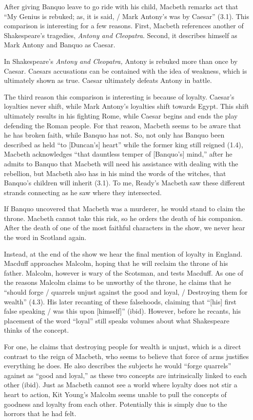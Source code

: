 \documentclass[12pt]{article}[titlepage]
\newcommand{\say}[1]{``#1''}
\newcommand{\1}{\={a}}
\newcommand{\2}{\={e}}
\newcommand{\3}{\={\i}}
\newcommand{\4}{\=o}
\newcommand{\5}{\=u}
\newcommand{\6}{\={A}}
\renewcommand{\,}{\textsuperscript{,}}
\begin{document}
After giving Banquo leave to go ride with his child, Macbeth remarks act that \say{My Genius is rebuked; as, it is said, / Mark Antony's was by Caesar} (3.1).
This comparison is interesting for a few reasons.
First, Macbeth references another of Shakespeare's tragedies, \textit{Antony and Cleopatra}.
Second, it describes himself as Mark Antony and Banquo as Caesar.

In Shakespeare's \textit{Antony and Cleopatra,} Antony is rebuked more than once by Caesar.
Caesars accusations can be contained with the idea of weakness, which is ultimately shown as true.
Caesar ultimately defeats Antony in battle.

The third reason this comparison is interesting is because of loyalty.
Caesar's loyalties never shift, while Mark Antony's loyalties shift towards Egypt.
This shift ultimately results in his fighting Rome, while Caesar begins and ends the play defending the Roman people.
For that reason, Macbeth seems to be aware that he has broken faith, while Banquo has not.
So, not only has Banquo been described as held \say{to [Duncan's] heart} while the former king still reigned (1.4), Macbeth acknowledges \say{that dauntless temper of [Banquo's] mind,} after he admits to Banquo that Macbeth will need his assistance with dealing with the rebellion, but Macbeth also has in his mind the words of the witches, that Banquo's children will inherit (3.1).
To me, Ready's Macbeth saw these different strands connecting as he saw where they intersected.

If Banquo uncovered that Macbeth was a murderer, he would stand to claim the throne.
Macbeth cannot take this risk, so he orders the death of his companion.
After the death of one of the most faithful characters in the show, we never hear the word in Scotland again.

Instead, at the end of the show we hear the final mention of loyalty in England.
Macduff approaches Malcolm, hoping that he will reclaim the throne of his father.
Malcolm, however is wary of the Scotsman, and tests Macduff.
As one of the reasons Malcolm claims to be unworthy of the throne, he claims that he \say{should forge / quarrels unjust against the good and loyal, / Destroying them for wealth} (4.3).
His later recanting of these falsehoods, claiming that \say{[his] first false speaking / was this upon [himself]} (ibid).
However, before he recants, his placement of the word \say{loyal} still speaks volumes about what Shakespeare thinks of the concept.

For one, he claims that destroying people for wealth is unjust, which is a direct contrast to the reign of Macbeth, who seems to believe that force of arms justifies everything he does.
He also describes the subjects he would \say{forge quarrels} against as \say{good and loyal,} as these two concepts are intrinsically linked to each other (ibid).
Just as Macbeth cannot see a world where loyalty does not stir a heart to action, Kit Young's Malcolm seems unable to pull the concepts of goodness and loyalty from each other.
Potentially this is simply due to the horrors that he had felt.
\end{document}
